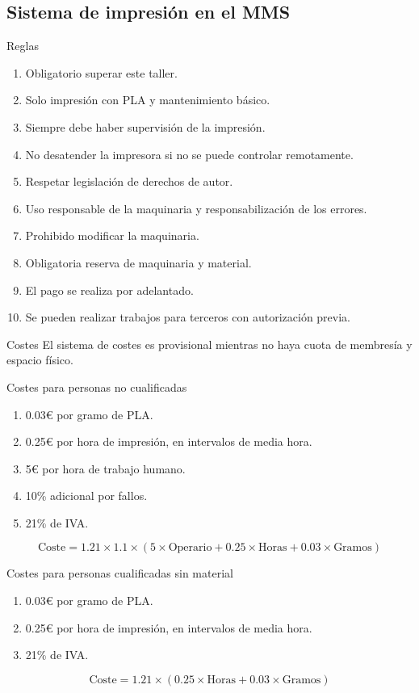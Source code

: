\documentclass{beamer}
\begin{document}
	\subsection{Sistema de impresión en el MMS}
	\begin{frame}{Reglas}
		\begin{enumerate}
			\item Obligatorio superar este taller.
			\item Solo impresión con PLA y mantenimiento básico.
			\item Siempre debe haber supervisión de la impresión.
			\item No desatender la impresora si no se puede controlar remotamente.
			\item Respetar legislación de derechos de autor.
			\item Uso responsable de la maquinaria y responsabilización de los errores.
			\item Prohibido modificar la maquinaria.
			\item Obligatoria reserva de maquinaria y material.
			\item El pago se realiza por adelantado.
			\item Se pueden realizar trabajos para terceros con autorización previa.
		\end{enumerate}
	\end{frame}
	\begin{frame}[standout]{Costes}
		El sistema de costes es provisional mientras no haya cuota de membresía y espacio físico.
	\end{frame}
	\begin{frame}{Costes para personas no cualificadas}
		\begin{enumerate}
			\item 0.03€ por gramo de PLA.
			\item 0.25€ por hora de impresión, en intervalos de media hora.
			\item 5€ por hora de trabajo humano.
			\item 10\% adicional por fallos.
			\item 21\% de IVA.
		\end{enumerate}
		$$\text{Coste}=1.21\times 1.1\times \left( 5\times \text{Operario} +0.25\times\text{Horas}+0.03\times\text{Gramos} \right)$$
	\end{frame}
	\begin{frame}{Costes para personas cualificadas sin material}
		\begin{enumerate}
			\item 0.03€ por gramo de PLA.
			\item 0.25€ por hora de impresión, en intervalos de media hora.
			\item 21\% de IVA.
		\end{enumerate}
		$$\text{Coste}=1.21\times \left( 0.25\times\text{Horas}+0.03\times\text{Gramos} \right)$$
	\end{frame}
\end{document}

